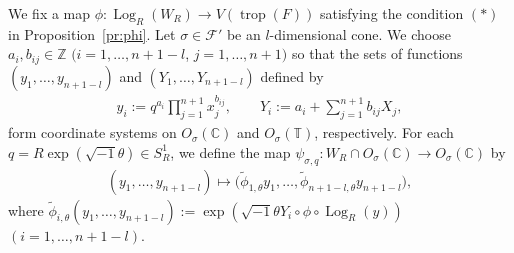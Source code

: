 \documentclass[10pt,a4paper]{amsart}
\numberwithin{equation}{section}
\begin{document}
We f\/ix a map $\phi \colon \operatorname{Log}_R(W_R) \to V(\operatorname{trop}(F))$ satisfying the condition $(\ast)$ in Proposition~\ref{pr:phi}. Let $\sigma \in {\mathcal F}'$ be an $l$-dimensional cone. We choose $a_i, b_{ij} \in {\mathbb Z}$ $(i=1, \dots, n+1-l$, $j=1, \dots, n+1)$ so that the sets of functions $(y_1, \dots ,y_{n+1-l})$ and $(Y_1, \dots, Y_{n+1-l})$ def\/ined by
\begin{gather}\label{eq:cood}
y_i:=q^{a_i}\prod_{j=1}^{n+1}x_j^{b_{ij}},\qquad Y_i:=a_i+\sum_{j=1}^{n+1}b_{ij}X_j,
\end{gather}
form coordinate systems on $O_\sigma({\mathbb C})$ and $O_\sigma({\mathbb T})$, respectively. For each $q = R \exp(\sqrt{-1}\theta) \in S_R^1$, we def\/ine the map $\psi_{\sigma,q} \colon W_R \cap O_\sigma({\mathbb C}) \to O_\sigma({\mathbb C})$ by
\begin{gather*}%
(y_1, \dots ,y_{n+1-l}) \mapsto \big(\tilde{\phi}_{1,\theta}y_1, \dots, \tilde{\phi}_{n+1-l,\theta}y_{n+1-l}\big),
\end{gather*}
where $\tilde{\phi}_{i,\theta}(y_1, \dots, y_{n+1-l}) := \exp \left(\sqrt{-1} \theta Y_i \circ \phi \circ \operatorname{Log}_R (y) \right)$ $(i=1, \dots, n+1-l)$.
\end{document}
